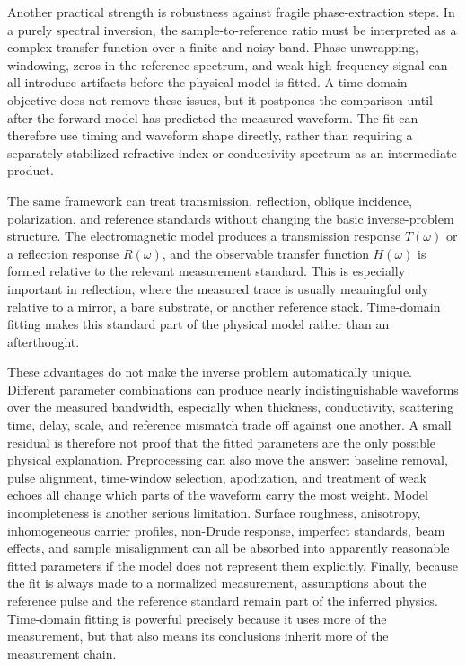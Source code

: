 \documentclass[11pt]{article}
\begin{document}
Another practical strength is robustness against fragile phase-extraction steps. In a purely spectral inversion, the sample-to-reference ratio must be interpreted as a complex transfer function over a finite and noisy band. Phase unwrapping, windowing, zeros in the reference spectrum, and weak high-frequency signal can all introduce artifacts before the physical model is fitted. A time-domain objective does not remove these issues, but it postpones the comparison until after the forward model has predicted the measured waveform. The fit can therefore use timing and waveform shape directly, rather than requiring a separately stabilized refractive-index or conductivity spectrum as an intermediate product.

The same framework can treat transmission, reflection, oblique incidence, polarization, and reference standards without changing the basic inverse-problem structure. The electromagnetic model produces a transmission response \(T(\omega)\) or a reflection response \(R(\omega)\), and the observable transfer function \(H(\omega)\) is formed relative to the relevant measurement standard. This is especially important in reflection, where the measured trace is usually meaningful only relative to a mirror, a bare substrate, or another reference stack. Time-domain fitting makes this standard part of the physical model rather than an afterthought.

These advantages do not make the inverse problem automatically unique. Different parameter combinations can produce nearly indistinguishable waveforms over the measured bandwidth, especially when thickness, conductivity, scattering time, delay, scale, and reference mismatch trade off against one another. A small residual is therefore not proof that the fitted parameters are the only possible physical explanation. Preprocessing can also move the answer: baseline removal, pulse alignment, time-window selection, apodization, and treatment of weak echoes all change which parts of the waveform carry the most weight. Model incompleteness is another serious limitation. Surface roughness, anisotropy, inhomogeneous carrier profiles, non-Drude response, imperfect standards, beam effects, and sample misalignment can all be absorbed into apparently reasonable fitted parameters if the model does not represent them explicitly. Finally, because the fit is always made to a normalized measurement, assumptions about the reference pulse and the reference standard remain part of the inferred physics. Time-domain fitting is powerful precisely because it uses more of the measurement, but that also means its conclusions inherit more of the measurement chain.
\end{document}
